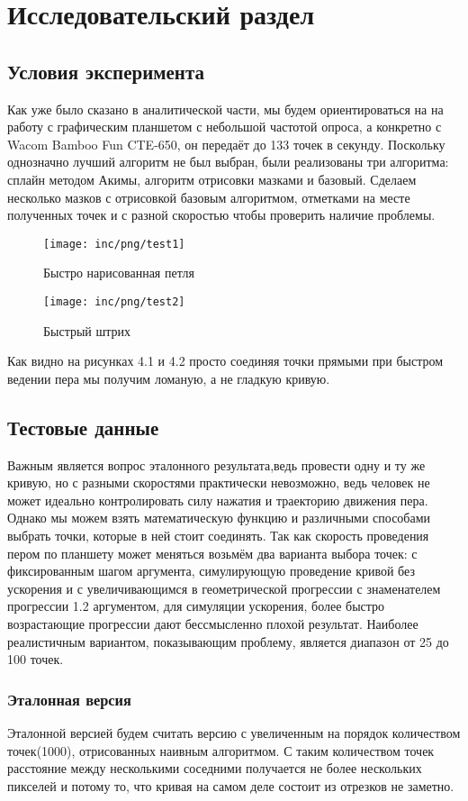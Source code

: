 \chapter{Исследовательский раздел}
\label{cha:research}

\section{Условия эксперимента}
Как уже было сказано в аналитической части, мы будем ориентироваться на на работу с графическим планшетом с небольшой частотой опроса, а конкретно с Wacom Bamboo Fun CTE-650, он передаёт до 133 точек в секунду. Поскольку однозначно лучший алгоритм не был выбран, были реализованы три алгоритма: сплайн методом Акимы, алгоритм отрисовки мазками и базовый. Сделаем несколько мазков с отрисовкой базовым алгоритмом, отметками на месте полученных точек и с разной скоростью чтобы проверить наличие проблемы.
\begin{figure}
		\texttt{[image: inc/png/test1]}
		\caption{Быстро нарисованная петля}
		\label{fig:test1}
\end{figure}

\begin{figure}
		\texttt{[image: inc/png/test2]}
		\caption{Быстрый штрих}
		\label{fig:test2}
\end{figure}

Как видно на рисунках 4.1 и 4.2 просто соединяя точки прямыми при быстром ведении пера мы получим ломаную, а не гладкую кривую.%
\section{Тестовые данные}
Важным является вопрос эталонного результата,ведь провести одну и ту же кривую, но с разными скоростями практически невозможно, ведь человек не может идеально контролировать силу нажатия и траекторию движения пера. Однако мы можем взять математическую функцию и различными способами выбрать точки, которые в ней стоит соединять. Так как скорость проведения пером по планшету может меняться возьмём два варианта выбора точек: с фиксированным шагом аргумента, симулирующую проведение кривой без ускорения и с увеличивающимся в геометрической прогрессии с знаменателем прогрессии 1.2 аргументом, для симуляции ускорения, более быстро возрастающие прогрессии дают бессмысленно плохой результат. Наиболее реалистичным вариантом, показывающим проблему, является диапазон от 25 до 100 точек.
\subsection{Эталонная версия}
Эталонной версией будем считать версию с увеличенным на порядок количеством точек(1000), отрисованных наивным алгоритмом. С таким количеством точек расстояние между несколькими соседними получается не более нескольких пикселей и потому то, что кривая на самом деле состоит из отрезков не заметно.
